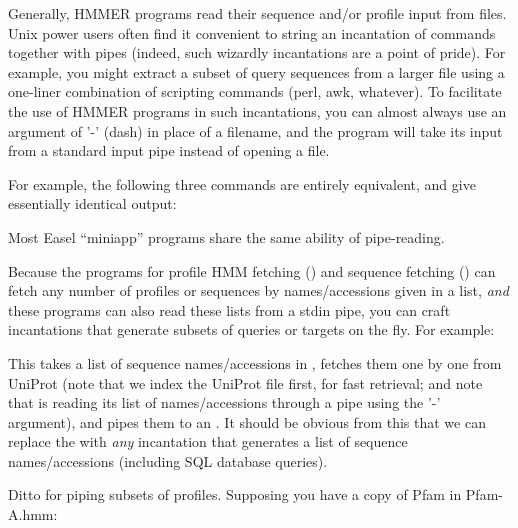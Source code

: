 Generally, HMMER programs read their sequence and/or profile input
from files. Unix power users often find it convenient to string an
incantation of commands together with pipes (indeed, such wizardly
incantations are a point of pride). For example, you might extract a
subset of query sequences from a larger file using a one-liner
combination of scripting commands (perl, awk, whatever). To facilitate
the use of HMMER programs in such incantations, you can almost always
use an argument of '-' (dash) in place of a filename, and the program
will take its input from a standard input pipe instead of opening a
file.

For example, the following three commands are entirely equivalent, and
give essentially identical output:




Most Easel ``miniapp'' programs share the same ability of pipe-reading.

Because the programs for profile HMM fetching () and
sequence fetching () can fetch any number of profiles
or sequences by names/accessions given in a list, \emph{and} these
programs can also read these lists from a stdin pipe, you can craft
incantations that generate subsets of queries or targets on the
fly. For example:



This takes a list of sequence names/accessions in
, fetches them one by one from UniProt (note that
we index the UniProt file first, for fast retrieval; and note that
 is reading its  list of
names/accessions through a pipe using the '-' argument), and pipes
them to an . It should be obvious from this that we
can replace the  with \emph{any} incantation
that generates a list of sequence names/accessions (including SQL
database queries).

Ditto for piping subsets of profiles. Supposing you have a copy of Pfam in Pfam-A.hmm:


